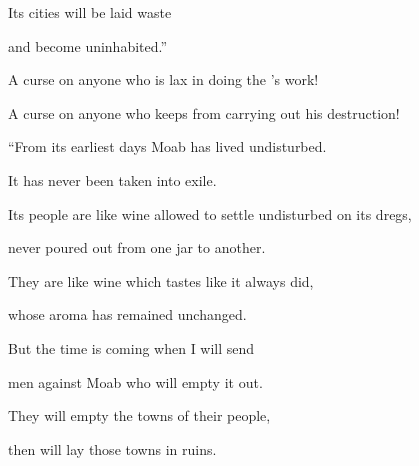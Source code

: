 {\par }{\Q Its cities
will be laid waste
\par }{\Q and become
uninhabited.”
\par }{\Q {}A curse
on anyone who is lax
in doing
the
{}’s
work!
\par }{\Q A curse
on anyone who keeps from
carrying out his destruction!
\par }{\Q {}“From its earliest
days Moab
has lived undisturbed.
\par }{\Q It has never been taken into exile.
\par }{\Q Its
people are like
wine allowed to settle undisturbed
on
its
dregs,
\par }{\Q never
poured out
from one jar to another.
\par }{\Q They are like
wine which
tastes like
it always
did,
\par }{\Q whose
aroma
has remained unchanged.
\par }{\Q {}But
the time
is
coming
when I will send
\par }{\Q men against Moab who
will empty it out.
\par }{\Q They will empty
the towns of their people,
\par }{\Q then will
lay those towns in ruins.

}
